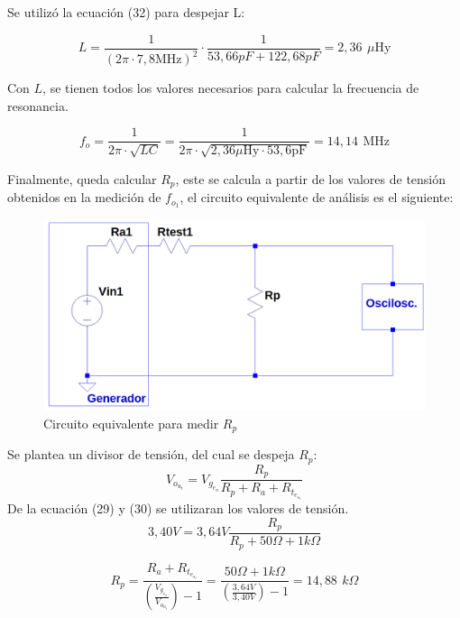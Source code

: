 Se utilizó la ecuación (32) para despejar L:

\begin{equation}
    L = \frac{1}{(2\pi\cdot7,8\text{MHz})^2}\cdot\frac{1}{53,66pF+122,68pF} = 2,36 \,\ \mu\text{Hy}
\end{equation}

\newpage

Con \(L\), se tienen todos los valores necesarios para calcular la frecuencia de resonancia.

\begin{equation}
    f_o = \frac{1}{2\pi \cdot \sqrt{LC}} = \frac{1}{2\pi \cdot \sqrt{2,36\mu \text{Hy}\cdot 53,6\text{pF}}} = 14,14 \,\ \text{MHz}
\end{equation}

Finalmente, queda calcular \(R_p\), este se calcula a partir de los valores de tensión obtenidos en la medición de \(f_o_1\), el circuito equivalente de análisis es el siguiente:

\begin{figure}[!h]
    \centering
    \includegraphics[scale=0.3]{Imagenes/RP.png}
    \caption{Circuito equivalente para medir \(R_p\)}
    \label{fig:Circrp}
\end{figure}

Se plantea un divisor de tensión, del cual se despeja \(R_p\):
\begin{equation}
    V_o_u_t = V_g_e_n\frac{R_p}{R_p+R_a+R_t_e_s_t} 
\end{equation}
De la ecuación (29) y (30) se utilizaran los valores de tensión.
\begin{equation}
    3,40V = 3,64V\frac{R_p}{R_p+50\Omega+1k\Omega} 
\end{equation}

\begin{equation}
    R_p = \frac{R_a+R_t_e_s_t}{(\frac{V_g_e_n}{V_o_u_t})-1} = \frac{50\Omega+1k\Omega}{(\frac{3,64V}{3,40V})-1} = \boxed{14,88 \,\ k\Omega}
\end{equation}

